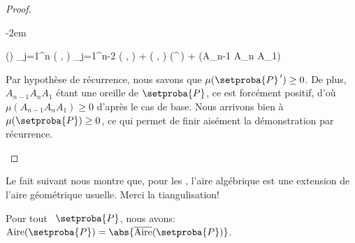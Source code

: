 \begin{proof}
\begin{itemize}
		\leavevmode\kern-2em%
		\begin{stepcalc}[style=ar*]
			\mu()
		\explnext{}
			\dsum_{j=1}^{n} \det \big(  ,  \big)
		          {}
			\dsum_{j=1}^{n-2} \det \big(  ,  \big)
			+
			\det \big(  ,  \big)
			\mu(^{\,\prime})
			+
			\mu(A_{n-1} A_n A_1)
		\end{stepcalc}


		\noindent
		Par hypothèse de récurrence, nous savons que
		$\mu(\setproba{P}^{\,\prime}) \geq 0$.
		De plus, $A_{n-1} A_n A_1$ étant une oreille de $\setproba{P}$, 
		ce  est forcément positif, d'où $\mu(A_{n-1} A_n A_1) \geq 0$ d'après le cas de base.
		Nous arrivons bien à $\mu(\setproba{P}) \geq 0$, ce qui permet de finir aisément la démonstration par récurrence.
	\end{itemize}
	
	\null\vspace{-6ex}
\end{proof}




Le fait suivant nous montre que, pour les \ngones, l'aire algébrique est une extension de l'aire géométrique usuelle. Merci la tiangulisation!


\begin{fact} \label{sarea-ngone}
    Pour tout \ngone\ $\setproba{P}$, nous avons:
    $\area{\setproba{P}} = \abs{\sarea{\setproba{P}}}$.
\end{fact}



